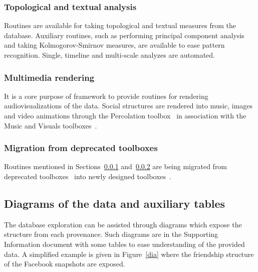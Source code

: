 	\subsubsection{Topological and textual analysis}\label{ana}
	Routines are available for taking topological and textual measures from
	the database.
	Auxiliary routines, such as performing principal component analysis
	and taking Kolmogorov-Smirnov measures, are available
	to ease pattern recognition.
	Single, timeline and multi-scale analyzes are automated.

	\subsubsection{Multimedia rendering}\label{media}
	It is a core purpose of framework to provide routines for rendering
	audiovisualizations of the data.
	Social structures are rendered into music, images and video animations
	through the Percolation toolbox~\cite{percolation} in association with
	the Music and Visuals toolboxes~\cite{music,visuals}.

	\subsubsection{Migration from deprecated toolboxes}
	Routines mentioned in Sections~\ref{ana} and~\ref{media} are being migrated from deprecated
	toolboxes~\cite{gmaneLegacy,percolationLegacy} into newly designed
	toolboxes~\cite{percolation,visuals}.

	\subsection{Diagrams of the data and auxiliary tables}
	The database exploration can be assisted through diagrams which expose
	the structure from each provenance.
	Such diagrams are in the Supporting Information document
	with some tables to ease understanding of the provided data.
	A simplified example is given in Figure~\ref{dia} where the friendship
	structure of the Facebook snapshots are exposed.

